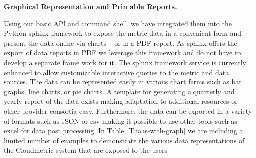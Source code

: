 \documentclass{tex/sig-alternate}
\begin{document}
{{\bf Graphical Representation and Printable Reports.}

Using our basic API and command shell, we have integrated them into
the Python sphinx framework \cite{brandl2009sphinx} to expose the
metric data in a convenient form and present the data online via
charts ~\cite{highsoft2012highcharts} or in a PDF report. As sphinx
offers the export of data reports in PDF we leverage this framework
and do not have to develop a separate frame work for it. The sphinx
framework service is currently enhanced to allow customizable
interactive queries to the metric and data sources. The data can be
represented easily in various chart forms such as bar graphs, line
charts, or pie charts. A template for generating a quarterly and
yearly report of the data exists making adaptation to additional
resources or other provider consortia easy. Furthermore, the data can
be exported in a variety of formats such as JSON or csv making it
possible to use other tools such as excel for data post processing.
In Table~\ref{T:iaas-with-graph} we are including a limited number of
examples to demonstrate the various data representations of the
Cloudmetric system that are exposed to the users 


}
\end{document}
